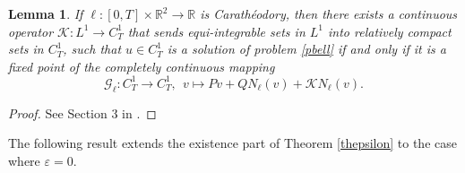 \documentclass[11pt]{amsart}
\newtheorem{lemma}[theorem]{Lemma}
\numberwithin{equation}{section} \textwidth=15.5cm
\begin{document}
\begin{lemma}\label{thpfix} If $\ell:[0,T]\times\mathbb{R}^2\to\mathbb{R}$ is Carath\'{e}odory, then
there exists a continuous operator $\mathcal{K}:L^1\to C_T^1$ that sends equi-integrable sets in $L^1$ into relatively compact sets in $C_T^1$, such that $u\in C^1_T$ is a solution of problem \eqref{pbell} if and only if it is a fixed point of the completely continuous mapping
$$\mathcal{G}_\ell:C_T^1\to C_T^1,\ \ v\mapsto Pv+QN_\ell(v)+\mathcal{K}N_\ell(v).$$
\end{lemma}
\begin{proof} See Section 3 in \cite{[HMMT]}.
\end{proof}

The following result extends the existence part of Theorem \ref{thepsilon} to the case where $\varepsilon = 0$.
\end{document}
